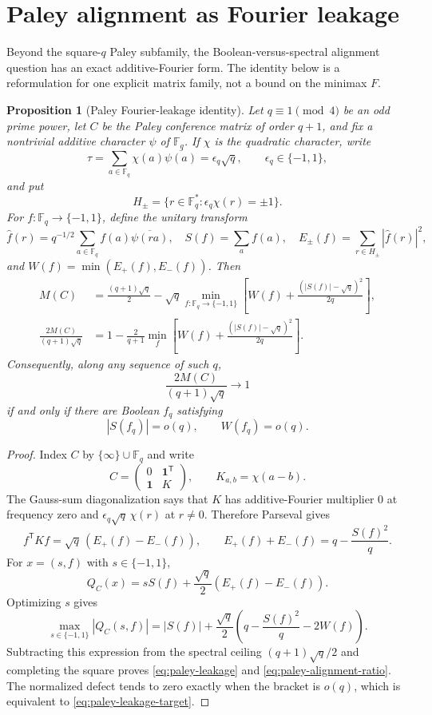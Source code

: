 \documentclass[11pt]{article}
\newtheorem{proposition}[theorem]{Proposition}
\newcommand{\eps}{\{-1,1\}}
\begin{document}
\section{Paley alignment as Fourier leakage}

Beyond the square-$q$ Paley subfamily, the Boolean-versus-spectral alignment
question has an exact additive-Fourier form.  The identity below is a
reformulation for one explicit matrix family, not a bound on the minimax $F$.

\begin{proposition}[Paley Fourier-leakage identity]
\label{prop:paley-leakage}
Let $q\equiv1\pmod4$ be an odd prime power, let $C$ be the Paley conference
matrix of order $q+1$, and fix a nontrivial additive character $\psi$ of
$\mathbb F_q$.  If $\chi$ is the quadratic character, write
\[
 \tau=\sum_{a\in\mathbb F_q}\chi(a)\overline{\psi(a)}
      =\epsilon_q\sqrt q,
 \qquad \epsilon_q\in\eps,
\]
and put
\[
 H_\pm=\{r\in\mathbb F_q^*: \epsilon_q\chi(r)=\pm1\}.
\]
For $f:\mathbb F_q\to\eps$, define the unitary transform
\[
 \widehat f(r)=q^{-1/2}\sum_{a\in\mathbb F_q}
 f(a)\overline{\psi(ra)},
 \quad S(f)=\sum_a f(a),
 \quad E_\pm(f)=\sum_{r\in H_\pm}|\widehat f(r)|^2,
\]
and $W(f)=\min(E_+(f),E_-(f))$.  Then
\begin{align}
 M(C)
 &=\frac{(q+1)\sqrt q}{2}
 -\sqrt q\min_{f:\mathbb F_q\to\eps}
 \left[W(f)+\frac{(|S(f)|-\sqrt q)^2}{2q}\right],
 \label{eq:paley-leakage}\\
 \frac{2M(C)}{(q+1)\sqrt q}
 &=1-\frac{2}{q+1}\min_f
 \left[W(f)+\frac{(|S(f)|-\sqrt q)^2}{2q}\right].
 \label{eq:paley-alignment-ratio}
\end{align}
Consequently, along any sequence of such $q$,
\[
 \frac{2M(C)}{(q+1)\sqrt q}\longrightarrow1
\]
if and only if there are Boolean $f_q$ satisfying
\begin{equation}
 |S(f_q)|=o(q),\qquad W(f_q)=o(q).
 \label{eq:paley-leakage-target}
\end{equation}
\end{proposition}

\begin{proof}
Index $C$ by $\{\infty\}\cup\mathbb F_q$ and write
\[
 C=\begin{pmatrix}0&\mathbf1^{\mathsf T}\\
                   \mathbf1&K\end{pmatrix},
 \qquad K_{a,b}=\chi(a-b).
\]
The Gauss-sum diagonalization says that $K$ has additive-Fourier multiplier
$0$ at frequency zero and $\epsilon_q\sqrt q\,\chi(r)$ at $r\ne0$.
Therefore Parseval gives
\[
 f^{\mathsf T}Kf=\sqrt q\,(E_+(f)-E_-(f)),
 \qquad E_+(f)+E_-(f)=q-\frac{S(f)^2}{q}.
\]
For $x=(s,f)$ with $s\in\eps$,
\[
 Q_C(x)=sS(f)+\frac{\sqrt q}{2}(E_+(f)-E_-(f)).
\]
Optimizing $s$ gives
\[
 \max_{s\in\eps}|Q_C(s,f)|
 =|S(f)|+\frac{\sqrt q}{2}
 \left(q-\frac{S(f)^2}{q}-2W(f)\right).
\]
Subtracting this expression from the spectral ceiling
$(q+1)\sqrt q/2$ and completing the square proves
\eqref{eq:paley-leakage} and \eqref{eq:paley-alignment-ratio}.  The normalized
defect tends to zero exactly when the bracket is $o(q)$, which is equivalent
to \eqref{eq:paley-leakage-target}.
\end{proof}
\end{document}
